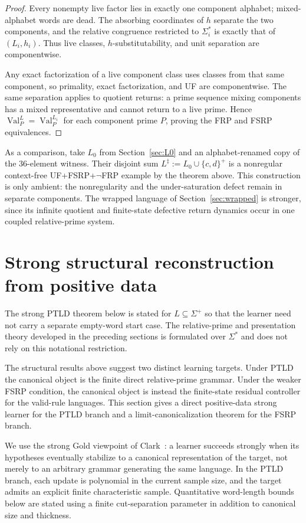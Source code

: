\documentclass[11pt,a4paper]{article}
\newcommand{\Val}{\operatorname{Val}}
\begin{document}
\begin{proof}
Every nonempty live factor lies in exactly one component alphabet; mixed-alphabet words are dead.  The absorbing coordinates of $h$ separate the two components, and the relative congruence restricted to $\Sigma_i^*$ is exactly that of $(L_i,h_i)$.  Thus live classes, $h$-substitutability, and unit separation are componentwise.

Any exact factorization of a live component class uses classes from that same component, so primality, exact factorization, and UF are componentwise.  The same separation applies to quotient returns: a prime sequence mixing components has a mixed representative and cannot return to a live prime.  Hence $\Val_P^L=\Val_P^{L_i}$ for each component prime $P$, proving the FRP and FSRP equivalences.
\end{proof}

As a comparison, take $L_0$ from Section~\ref{sec:L0} and an alphabet-renamed copy of the $36$-element witness.  Their disjoint sum
\(L^\ddagger:=L_0\cup\{c,d\}^+\)
is a nonregular context-free UF+FSRP+$\neg$FRP example by the theorem above.  This construction is only ambient: the nonregularity and the under-saturation defect remain in separate components.  The wrapped language of Section~\ref{sec:wrapped} is stronger, since its infinite quotient and finite-state defective return dynamics occur in one coupled relative-prime system.

\section{Strong structural reconstruction from positive data}
\label{sec:strong-learning}

The strong PTLD theorem below is stated for $L\subseteq\Sigma^+$ so that the learner need not carry a separate empty-word start case.  The relative-prime and presentation theory developed in the preceding sections is formulated over $\Sigma^*$ and does not rely on this notational restriction.

The structural results above suggest two distinct learning targets.  Under PTLD the canonical object is the finite direct relative-prime grammar.  Under the weaker FSRP condition, the canonical object is instead the finite-state residual controller for the valid-rule languages.  This section gives a direct positive-data strong learner for the PTLD branch and a limit-canonicalization theorem for the FSRP branch.

We use the strong Gold viewpoint of Clark~\cite{Clark2013Trees}: a learner succeeds strongly when its hypotheses eventually stabilize to a canonical representation of the target, not merely to an arbitrary grammar generating the same language.  In the PTLD branch, each update is polynomial in the current sample size, and the target admits an explicit finite characteristic sample.  Quantitative word-length bounds below are stated using a finite cut-separation parameter in addition to canonical size and thickness.
\end{document}
